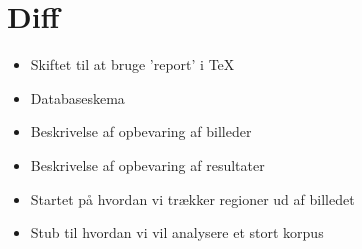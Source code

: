 {
\section*{Diff}
\begin{itemize}
    \item Skiftet til at bruge 'report' i \TeX{}
    \item Databaseskema
    \item Beskrivelse af opbevaring af billeder
    \item Beskrivelse af opbevaring af resultater
    \item Startet på hvordan vi trækker regioner ud af billedet
    \item Stub til hvordan vi vil analysere et stort korpus
\end{itemize}

}


